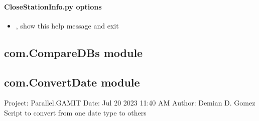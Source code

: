 \documentclass[letterpaper,10pt,english]{sphinxmanual}
\begin{document}
\paragraph{CloseStationInfo.py options}
\label{\detokenize{com:CloseStationInfo.py-options}}\begin{itemize}
\item {} 
\sphinxAtStartPar
{\hyperref[\detokenize{com:CloseStationInfo.py--h}]{}}, {\hyperref[\detokenize{com:CloseStationInfo.py---help}]{}} \sphinxhyphen{} show this help message and exit

\end{itemize}


\subsection{com.CompareDBs module}
\label{\detokenize{com:module-com.CompareDBs}}\label{\detokenize{com:com-comparedbs-module}}

\begin{fulllineitems}
\label{\detokenize{com:com.CompareDBs.main}}
\pysigstartsignatures
{}
\pysigstopsignatures
\end{fulllineitems}



\subsection{com.ConvertDate module}
\label{\detokenize{com:module-com.ConvertDate}}\label{\detokenize{com:com-convertdate-module}}
\sphinxAtStartPar
Project: Parallel.GAMIT
Date: Jul 20 2023 11:40 AM
Author: Demian D. Gomez
Script to convert from one date type to others

\begin{fulllineitems}
\label{\detokenize{com:com.ConvertDate.main}}
\pysigstartsignatures
{}
\pysigstopsignatures
\end{fulllineitems}
\end{document}
